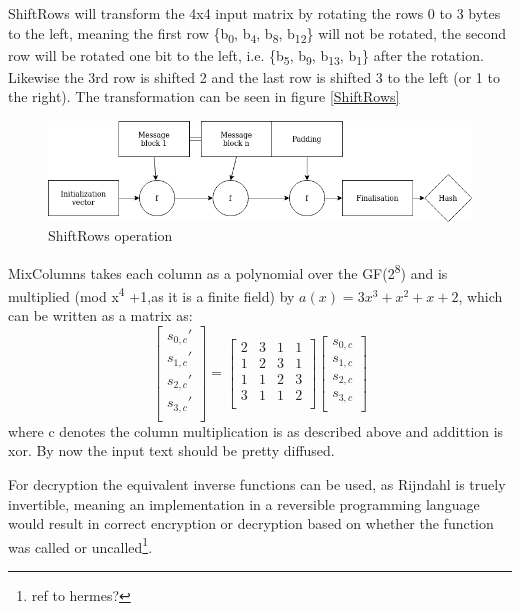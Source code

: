 \documentclass[a4paper]{article}
\begin{document}
ShiftRows will transform the 4x4 input matrix by rotating the rows 0 to 3 bytes to the left, meaning the first row \{b\textsubscript{0}, b\textsubscript{4}, b\textsubscript{8}, b\textsubscript{12}\} will not be rotated, the second row will be rotated one bit to the left, i.e. \{b\textsubscript{5}, b\textsubscript{9}, b\textsubscript{13}, b\textsubscript{1}\} after the rotation. Likewise the 3rd row is shifted 2 and the last row is shifted 3 to the left (or 1 to the right). The transformation can be seen in figure \ref{ShiftRows}


\begin{figure}[htbp]
\centering
\includegraphics[width=.9\linewidth]{./merkle.png}
\caption{\label{fig:ShiftRows}ShiftRows operation}
\end{figure}

MixColumns takes each column as a polynomial over the GF(2\textsuperscript{8}) and is multiplied (mod x\textsuperscript{4} +1,as it is a finite field) by \(a(x) = 3x^3 + x^2 + x + 2\), which can be written as a matrix as:
\[
\begin{bmatrix}
 s_{0,c}' \\
 s_{1,c}' \\
 s_{2,c}' \\
 s_{3,c}' \\
\end{bmatrix}=
\begin{bmatrix}
 2 & 3 & 1 & 1 \\
 1 & 2 & 3 & 1 \\
 1 & 1 & 2 & 3 \\
 3 & 1 & 1 & 2 \\
\end{bmatrix}
\begin{bmatrix}
 s_{0,c} \\
 s_{1,c} \\
 s_{2,c} \\
 s_{3,c} \\
\end{bmatrix}
\]
where c denotes the column multiplication is as described above and addittion is xor. By now the input text should be pretty diffused.

For decryption the equivalent inverse functions can be used, as Rijndahl is truely invertible, meaning an implementation in a reversible programming language would result in correct encryption or decryption based on whether the function was called or uncalled\footnote{ref to hermes?}.
\end{document}
